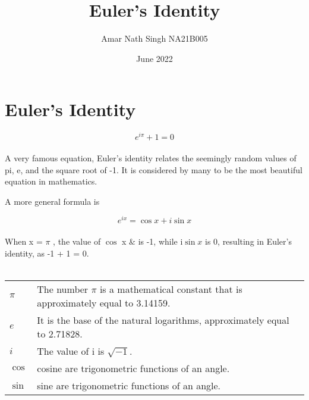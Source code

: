 \documentclass{article}
\title{Euler’s Identity}
\author{Amar Nath Singh NA21B005}
\date{June 2022}
\begin{document}
\maketitle

\section{Euler’s Identity}
\begin{equation}
    e^{i\pi} + 1 = 0
\end{equation}
\\
A very famous equation, Euler’s identity relates the seemingly random values of pi, e, and the square root of -1. It is considered by many to be the most beautiful equation in mathematics.

A more general formula is

\begin{equation}
    e^{i x} = \cos x + i \sin x
\end{equation}
\\
When x = $\pi$ , the value of $\cos$ x & is -1, while  i$\sin x$  is 0, resulting in Euler’s identity, as -1 + 1 = 0.\\ \\
\begin{center}
\begin{tabular}{ |l|l| } 
 \hline
 $\pi$ & The number $\pi$ is a mathematical constant that is approximately equal to 3.14159. \\  
 $e$ & It is the base of the natural logarithms, approximately equal to 2.71828.\\
 $i$ & The value of i is $\sqrt{-1}$.\\
 $\cos$ & cosine are trigonometric functions of an angle.\\
 $\sin$ & sine are trigonometric functions of an angle.\\
 \hline
\end{tabular}
\end{center}
\end{document}
